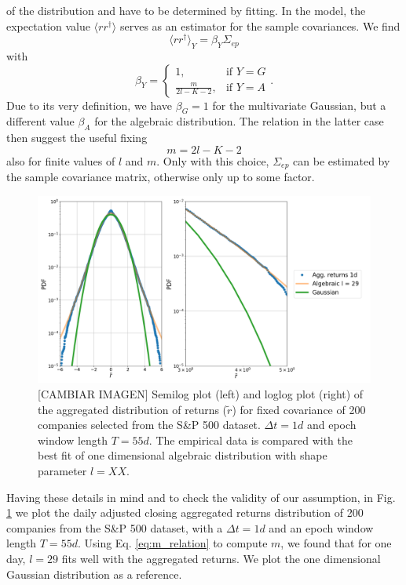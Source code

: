 of the distribution and have to be determined by fitting. In the model, the
expectation value $\langle r r^{\dagger} \rangle$ serves as an estimator for
the sample covariances. We find
\begin{equation}
    \langle r r^{\dagger} \rangle_{Y} = \beta_{Y} \Sigma_{ep}
\end{equation}
with
\begin{equation}
    \beta_{Y}=\begin{cases}
    1, & \text{if }Y=G\\
    \frac{m}{2l-K-2}, & \text{if }Y=A
\end{cases}.
\end{equation}
Due to its very definition, we have $\beta_{G} = 1$ for the multivariate
Gaussian, but a different value $\beta_{A}$ for the algebraic distribution. The
relation in the latter case then suggest the useful fixing
\begin{equation}\label{eq:m_relation}
    m = 2l - K - 2
\end{equation}
also for finite values of $l$ and $m$. Only with this choice, $\Sigma_{ep}$ can
be estimated by the sample covariance matrix, otherwise only up to some factor.

\begin{figure}[htbp]
    \centering
    \includegraphics[width=0.7\columnwidth]
    {figures/05_algebraic_agg_returns_short_epoch.png}
    \caption{[CAMBIAR IMAGEN] Semilog plot (left) and loglog plot (right) of the aggregated
             distribution of returns ($\tilde{r}$) for fixed covariance of 200
             companies selected from the S\&P 500 dataset. $\Delta t = 1d$ and
             epoch window length $T=55d$. The empirical data is compared with
             the best fit of one dimensional algebraic distribution with shape
             parameter $l=XX$.}
    \label{fig:algebraic_agg_returns_epoch}
\end{figure}

Having these details in mind and to check the validity of our assumption, in
Fig. \ref{fig:algebraic_agg_returns_epoch} we plot the daily adjusted closing
aggregated returns distribution of 200 companies from the S\&P 500 dataset,
with a $\Delta t = 1d$ and an epoch window length $T = 55d$. Using Eq.
\ref{eq:m_relation} to compute $m$, we found that for one day, $l = 29$ fits
well with the aggregated returns. We plot the one dimensional Gaussian
distribution as a reference.

